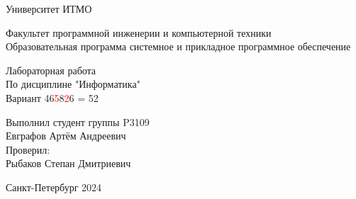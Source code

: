 

\thispagestyle{empty}
\begin{center}
\LARGE{Университет ИТМО} 
\vspace{20pt}

\LARGE{Факультет программной инженерии и компьютерной техники \\
Образовательная программа системное и прикладное программное обеспечение}
\vspace{160pt}

\LARGE{Лабораторная работа   \\
По дисциплине "Информатика" \\ 
Вариант 46\textcolor{red}{5}8\textcolor{red}{2}6} = 52
\vspace{120pt}
\end{center}

\begin{flushright}
\LARGE{Выполнил студент группы P3109 \\
Евграфов Артём Андреевич \\
Проверил:\\
Рыбаков Степан Дмитриевич}
\vspace{120pt}
\end{flushright}

\begin{center}
\Large{Санкт-Петербург 2024}
\end{center}

\newpage
\setcounter{page}{1}
\tableofcontents
\newpage

